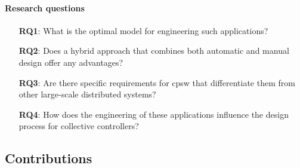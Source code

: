 \begin{refsection}
\paragraph*{Research questions}
\begin{itemize}
    \item[\textbf{RQ1}:] What is the optimal model for engineering such applications?
    \item[\textbf{RQ2}:] Does a hybrid approach that combines both automatic and manual design offer any advantages? 
    \item[\textbf{RQ3}:] Are there specific requirements for \ac{cpsw} that differentiate them from other large-scale distributed systems?
    \item[\textbf{RQ4}:] How does the engineering of these applications influence the design process for collective controllers?
\end{itemize}

\subsection*{Contributions}


\end{refsection}
